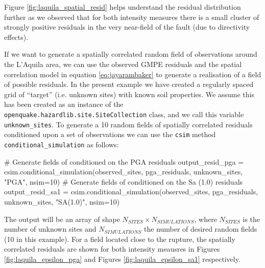 Figure \ref{fig:laquila_spatial_resid} helps understand the residual distribution further as we observed that for both intensity measures there is a small cluster of strongly positive residuals in the very near-field of the fault (due to directivity effects).

If we want to generate a spatially correlated random field of observations around the L'Aquila area, we can use the observed GMPE residuals and the spatial correlation model in equation \ref{eq:jayarambaker} to generate a realisation of a field of possible residuals. In the present example we have created a regularly spaced grid of ``target'' (i.e. unknown sites) with known soil properties. We assume this has been created as an instance of the \verb=openquake.hazardlib.site.SiteCollection= class, and we call this variable \verb=unknown_sites=. To generate a 10 random fields of spatially correlated residuals conditioned upon a set of observations we can use the \verb=csim= method \verb=conditional_simulation= as follows:

\begin{python}
# Generate fields of conditioned on the PGA residuals
output_resid_pga = csim.conditional_simulation(observed_sites,
                                               pga_residuals,
                                               unknown_sites,
                                               "PGA",
                                               nsim=10)
# Generate fields of conditioned on the Sa (1.0) residuals
output_resid_sa1 = csim.conditional_simulation(observed_sites,
                                               pga_residuals,
                                               unknown_sites,
                                               "SA(1.0)",
                                               nsim=10)
\end{python}
\noindent The output will be an array of shape $N_{SITES} \times N_{SIMULATIONS}$, where $N_{SITES}$ is the number of unknown sites and $N_{SIMULATIONS}$ the number of desired random fields (10 in this example). For a field located close to the rupture, the spatially correlated residuals are shown for both intensity meausres in Figures \ref{fig:laquila_epsilon_pga} and Figures \ref{fig:laquila_epsilon_sa1} respectively.  

